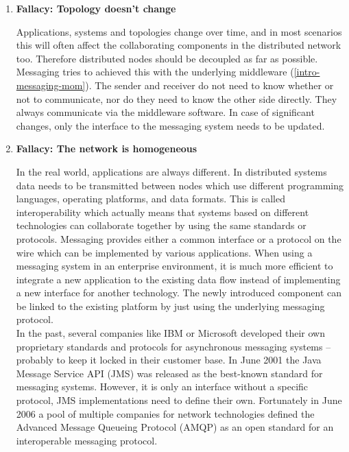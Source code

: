 \begin{enumerate}
{      }

    \item{\textbf{Fallacy: Topology doesn't change}

        Applications, systems and topologies change over time, and in most
        scenarios this will often affect the collaborating components in the
        distributed network too. Therefore distributed nodes should be decoupled
        as far as possible. Messaging tries to achieved this with the underlying
        middleware (\ref{intro-messaging-mom}). The sender and receiver do not need
        to know whether or not to communicate, nor do they need to know the other 
        side directly. They always communicate via the middleware software. In 
        case of significant changes, only the interface to the messaging system 
        needs to be updated.

      }

    \item{\textbf{Fallacy: The network is homogeneous}

        In the real world, applications are always different. In distributed systems
        data needs to be transmitted between nodes which use different
        programming languages, operating platforms, and data formats.  This is
        called interoperability which actually means that systems based on
        different technologies can collaborate together by using the same
        standards or protocols. Messaging provides either a common interface or
        a protocol on the wire which can be implemented by various
        applications. When using a messaging system in an enterprise
        environment, it is much more efficient to integrate a new application to
        the existing data flow instead of implementing a new interface for
        another technology. The newly introduced component can be linked to the
        existing platform by just using the underlying messaging protocol.\\

        In the past, several companies like IBM or Microsoft developed their own
        proprietary standards and protocols for asynchronous messaging systems
        -- probably to keep it locked in their customer base. In June 2001 the
        Java Message Service API (JMS) was released as the best-known standard for
        messaging systems. However, it is only an interface without a specific
        protocol, JMS implementations need to define their own. Fortunately in
        June 2006 a pool of multiple companies for network technologies defined
        the Advanced Message Queueing Protocol (AMQP) as an open standard for an
        interoperable messaging protocol. \cite{PrpAMQP}

    }

\end{enumerate} \cite{EIP03}\cite{fallacies}

